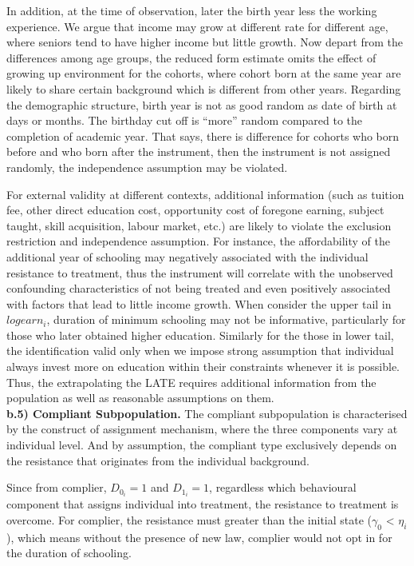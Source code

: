 \documentclass[a4paper,12pt,oneside,English]{article}
\begin{document}
In addition, at the time of observation, later the birth year less the working experience. We argue that income may grow at different rate for different age, where seniors tend to have higher income but little growth. Now depart from the differences among age groups, the reduced form estimate omits the effect of growing up environment for the cohorts, where cohort born at the same year are likely to share certain background which is different from other years. Regarding the demographic structure, birth year is not as good random as date of birth at days or months. The birthday cut off is “more” random compared to the completion of academic year. That says, there is difference for cohorts who born before and who born after the instrument, then the instrument is not assigned randomly, the independence assumption may be violated.

For external validity at different contexts, additional information (such as tuition fee, other direct education cost, opportunity cost of foregone earning, subject taught, skill acquisition, labour market, etc.) are likely to violate the exclusion restriction and independence assumption. For instance, the affordability of the additional year of schooling may negatively associated with the individual resistance to treatment, thus the instrument will correlate with the unobserved confounding characteristics of not being treated and even positively associated with factors that lead to little income growth. When consider the upper tail in \emph{$logearn_i$}, duration of minimum schooling may not be informative, particularly for those who later obtained higher education. Similarly for the those in lower tail, the identification valid only when we impose strong assumption that individual always invest more on education within their constraints whenever it is possible. Thus, the extrapolating the LATE requires additional information from the population as well as reasonable assumptions on them. \\

\textbf{b.5) Compliant Subpopulation.} The compliant subpopulation is characterised by the construct of assignment mechanism, where the three components vary at individual level. And by assumption, the compliant type exclusively depends on the resistance that originates from the individual background.

Since from complier, $D_0_i=1$ and $D_1_i=1$, regardless which behavioural component that assigns individual into treatment, the resistance to treatment is overcome. For complier, the resistance must greater than the initial state ($\gamma_0$ < $\eta_i$), which means without the presence of new law, complier would not opt in for the duration of schooling.
\end{document}
